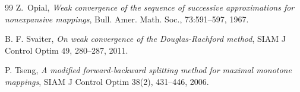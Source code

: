 \documentclass[11pt]{article}
\theoremstyle{definition}
\theoremstyle{definition}
\theoremstyle{definition}
\begin{document}
\begin{thebibliography}{99}
 {\sc Z.~Opial},
\emph{  Weak convergence of the sequence of successive approximations for
  nonexpansive mappings},
 { Bull. Amer. Math. Soc.}, 73:591--597, 1967.

   {\sc B. F. Svaiter},\emph{ On weak convergence of the Douglas-Rachford method}, SIAM J Control Optim 49, 280--287, 2011.

   {\sc P. Tseng}, \emph{A modified forward-backward splitting method for maximal monotone mappings}, SIAM J Control Optim 38(2), 431--446, 2006.



%
%
%



\end{thebibliography}
\end{document}
